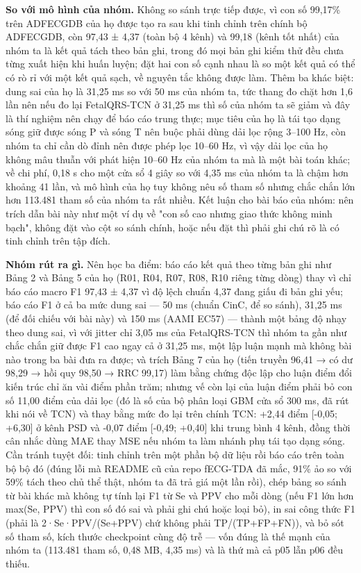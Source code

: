 \documentclass[12pt,a4paper]{article}
\begin{document}
\noindent \textbf{\color{tdtblue}So với mô hình của nhóm.} Không so sánh trực tiếp được, vì con số 99,17\% trên ADFECGDB của họ được tạo ra sau khi tinh chỉnh trên chính bộ ADFECGDB, còn 97,43 ± 4,37 (toàn bộ 4 kênh) và 99,18 (kênh tốt nhất) của nhóm ta là kết quả tách theo bản ghi, trong đó mọi bản ghi kiểm thử đều chưa từng xuất hiện khi huấn luyện; đặt hai con số cạnh nhau là so một kết quả có thể có rò rỉ với một kết quả sạch, về nguyên tắc không được làm. Thêm ba khác biệt: dung sai của họ là 31,25 ms so với 50 ms của nhóm ta, tức thang đo chặt hơn 1,6 lần nên nếu đo lại FetalQRS-TCN ở 31,25 ms thì số của nhóm ta sẽ giảm và đây là thí nghiệm nên chạy để báo cáo trung thực; mục tiêu của họ là tái tạo dạng sóng giữ được sóng P và sóng T nên buộc phải dùng dải lọc rộng 3–100 Hz, còn nhóm ta chỉ cần dò đỉnh nên được phép lọc 10–60 Hz, vì vậy dải lọc của họ không mâu thuẫn với phát hiện 10–60 Hz của nhóm ta mà là một bài toán khác; về chi phí, 0,18 s cho một cửa sổ 4 giây so với 4,35 ms của nhóm ta là chậm hơn khoảng 41 lần, và mô hình của họ tuy không nêu số tham số nhưng chắc chắn lớn hơn 113.481 tham số của nhóm ta rất nhiều. Kết luận cho bài báo của nhóm: nên trích dẫn bài này như một ví dụ về "con số cao nhưng giao thức không minh bạch", không đặt vào cột so sánh chính, hoặc nếu đặt thì phải ghi chú rõ là có tinh chỉnh trên tập đích.\par\vspace{3pt}
\noindent \textbf{\color{tdtblue}Nhóm rút ra gì.} Nên học ba điểm: báo cáo kết quả theo từng bản ghi như Bảng 2 và Bảng 5 của họ (R01, R04, R07, R08, R10 riêng từng dòng) thay vì chỉ báo cáo macro F1 97,43 ± 4,37 vì độ lệch chuẩn 4,37 đang giấu đi bản ghi yếu; báo cáo F1 ở cả ba mức dung sai — 50 ms (chuẩn CinC, để so sánh), 31,25 ms (để đối chiếu với bài này) và 150 ms (AAMI EC57) — thành một bảng độ nhạy theo dung sai, vì với jitter chỉ 3,05 ms của FetalQRS-TCN thì nhóm ta gần như chắc chắn giữ được F1 cao ngay cả ở 31,25 ms, một lập luận mạnh mà không bài nào trong ba bài đưa ra được; và trích Bảng 7 của họ (tiến truyền 96,41 → có dư 98,29 → hồi quy 98,50 → RRC 99,17) làm bằng chứng độc lập cho luận điểm đổi kiến trúc chỉ ăn vài điểm phần trăm; nhưng vế còn lại của luận điểm phải bỏ con số 11,00 điểm của dải lọc (đó là số của bộ phân loại GBM cửa sổ 300 ms, đã rút khi nói về TCN) và thay bằng mức đo lại trên chính TCN: +2,44 điểm [-0,05; +6,30] ở kênh PSD và -0,07 điểm [-0,49; +0,40] khi trung bình 4 kênh, đồng thời cân nhắc dùng MAE thay MSE nếu nhóm ta làm nhánh phụ tái tạo dạng sóng. Cần tránh tuyệt đối: tinh chỉnh trên một phần bộ dữ liệu rồi báo cáo trên toàn bộ bộ đó (đúng lỗi mà README cũ của repo fECG-TDA đã mắc, 91\% ảo so với 59\% tách theo chủ thể thật, nhóm ta đã trả giá một lần rồi), chép bảng so sánh từ bài khác mà không tự tính lại F1 từ Se và PPV cho mỗi dòng (nếu F1 lớn hơn max(Se, PPV) thì con số đó sai và phải ghi chú hoặc loại bỏ), in sai công thức F1 (phải là 2·Se·PPV/(Se+PPV) chứ không phải TP/(TP+FP+FN)), và bỏ sót số tham số, kích thước checkpoint cùng độ trễ — vốn đúng là thế mạnh của nhóm ta (113.481 tham số, 0,48 MB, 4,35 ms) và là thứ mà cả p05 lẫn p06 đều thiếu.\par\vspace{3pt}
\vspace{6pt}
\end{document}
